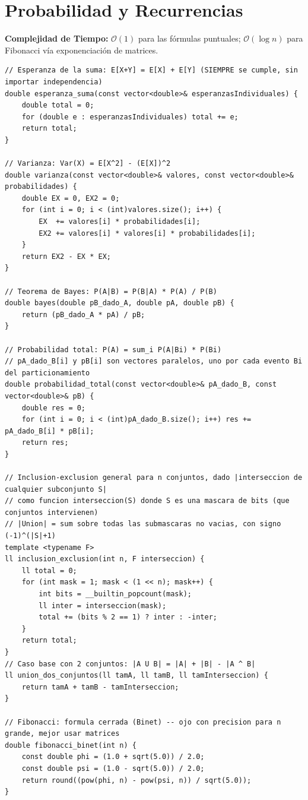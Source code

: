 \documentclass[10pt,twocolumn,letterpaper]{report}
\begin{document}
\section{Probabilidad y Recurrencias}
\textbf{Complejidad de Tiempo:} $\mathcal{O}(1)$ para las fórmulas puntuales; $\mathcal{O}(\log n)$ para Fibonacci vía exponenciación de matrices.
\begin{lstlisting}
// Esperanza de la suma: E[X+Y] = E[X] + E[Y] (SIEMPRE se cumple, sin importar independencia)
double esperanza_suma(const vector<double>& esperanzasIndividuales) {
    double total = 0;
    for (double e : esperanzasIndividuales) total += e;
    return total;
}

// Varianza: Var(X) = E[X^2] - (E[X])^2
double varianza(const vector<double>& valores, const vector<double>& probabilidades) {
    double EX = 0, EX2 = 0;
    for (int i = 0; i < (int)valores.size(); i++) {
        EX  += valores[i] * probabilidades[i];
        EX2 += valores[i] * valores[i] * probabilidades[i];
    }
    return EX2 - EX * EX;
}

// Teorema de Bayes: P(A|B) = P(B|A) * P(A) / P(B)
double bayes(double pB_dado_A, double pA, double pB) {
    return (pB_dado_A * pA) / pB;
}

// Probabilidad total: P(A) = sum_i P(A|Bi) * P(Bi)
// pA_dado_B[i] y pB[i] son vectores paralelos, uno por cada evento Bi del particionamiento
double probabilidad_total(const vector<double>& pA_dado_B, const vector<double>& pB) {
    double res = 0;
    for (int i = 0; i < (int)pA_dado_B.size(); i++) res += pA_dado_B[i] * pB[i];
    return res;
}

// Inclusion-exclusion general para n conjuntos, dado |interseccion de cualquier subconjunto S|
// como funcion interseccion(S) donde S es una mascara de bits (que conjuntos intervienen)
// |Union| = sum sobre todas las submascaras no vacias, con signo (-1)^(|S|+1)
template <typename F>
ll inclusion_exclusion(int n, F interseccion) {
    ll total = 0;
    for (int mask = 1; mask < (1 << n); mask++) {
        int bits = __builtin_popcount(mask);
        ll inter = interseccion(mask);
        total += (bits % 2 == 1) ? inter : -inter;
    }
    return total;
}
// Caso base con 2 conjuntos: |A U B| = |A| + |B| - |A ^ B|
ll union_dos_conjuntos(ll tamA, ll tamB, ll tamInterseccion) {
    return tamA + tamB - tamInterseccion;
}

// Fibonacci: formula cerrada (Binet) -- ojo con precision para n grande, mejor usar matrices
double fibonacci_binet(int n) {
    const double phi = (1.0 + sqrt(5.0)) / 2.0;
    const double psi = (1.0 - sqrt(5.0)) / 2.0;
    return round((pow(phi, n) - pow(psi, n)) / sqrt(5.0));
}


\end{lstlisting}
\end{document}
